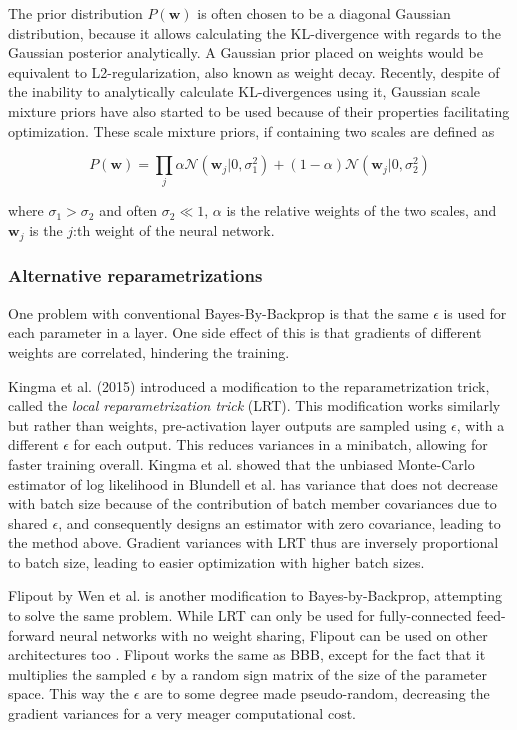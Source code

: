 	
	The prior distribution $P(\pmb{w})$ is often chosen to be a diagonal Gaussian distribution, because it allows calculating the KL-divergence with regards to the Gaussian posterior analytically. A Gaussian prior placed on weights would be equivalent to L2-regularization, also known as weight decay. Recently, despite of the inability to analytically calculate KL-divergences using it, Gaussian scale mixture priors have also started to be used \cite{blundell_weight_2015, shridhar_comprehensive_2019} because of their properties facilitating optimization. These scale mixture priors, if containing two scales are defined as 
	
	\begin{equation}
	\label{eq:gsm}
		P(\pmb{w}) = 
		\prod_{j}\alpha \mathcal{N}(\pmb{w}_j|0,\sigma_1^2) + (1-\alpha)\mathcal{N}(\pmb{w}_j|0,\sigma_2^2)
	\end{equation}  
	
	where $\sigma_1 > \sigma_2$ and often $\sigma_2 \ll 1$, $\alpha$ is the relative weights of the two scales, and $\pmb{w}_j$ is the $j$:th weight of the neural network. 
	
	\subsubsection*{Alternative reparametrizations}

	One problem with conventional Bayes-By-Backprop is that the same $\epsilon$ is used for each parameter in a layer. One side effect of this is that gradients of different weights are correlated, hindering the training. 
	
	Kingma et al. (2015) \cite{kingma_variational_2015} introduced a modification to the reparametrization trick, called the \textit{local reparametrization trick} (LRT). This modification works similarly but rather than weights, pre-activation layer outputs are sampled using $\epsilon$, with a different $\epsilon$ for each output. This reduces variances in a minibatch, allowing for faster training overall. Kingma et al. showed that the unbiased Monte-Carlo estimator of log likelihood in Blundell et al. has variance that does not decrease with batch size because of the contribution of batch member covariances due to shared $\epsilon$, and consequently designs an estimator with zero covariance, leading to the method above. Gradient variances with LRT thus are inversely proportional to batch size, leading to easier optimization with higher batch sizes. 

	Flipout by Wen et al. \cite{wen_flipout_2018} is another modification to Bayes-by-Backprop, attempting to solve the same problem. While LRT can only be used for fully-connected feed-forward neural networks with no weight sharing, Flipout can be used on other architectures too \cite{wen_flipout_2018}. Flipout works the same as BBB, except for the fact that it multiplies the sampled $\epsilon$ by a random sign matrix of the size of the parameter space. This way the $\epsilon$ are to some degree made pseudo-random, decreasing the gradient variances for a very meager computational cost.
	
